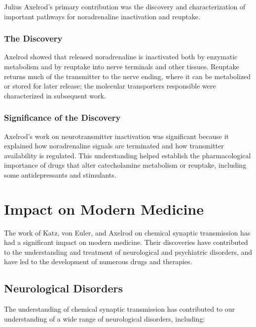 Julius Axelrod's primary contribution was the discovery and characterization of important pathways for noradrenaline inactivation and reuptake.

\subsubsection{The Discovery}

Axelrod showed that released noradrenaline is inactivated both by enzymatic metabolism and by reuptake into nerve terminals and other tissues. Reuptake returns much of the transmitter to the nerve ending, where it can be metabolized or stored for later release; the molecular transporters responsible were characterized in subsequent work.

\subsubsection{Significance of the Discovery}

Axelrod's work on neurotransmitter inactivation was significant because it explained how noradrenaline signals are terminated and how transmitter availability is regulated. This understanding helped establish the pharmacological importance of drugs that alter catecholamine metabolism or reuptake, including some antidepressants and stimulants.

\section{Impact on Modern Medicine}

The work of Katz, von Euler, and Axelrod on chemical synaptic transmission has had a significant impact on modern medicine. Their discoveries have contributed to the understanding and treatment of neurological and psychiatric disorders, and have led to the development of numerous drugs and therapies.

\subsection{Neurological Disorders}

The understanding of chemical synaptic transmission has contributed to our understanding of a wide range of neurological disorders, including:

